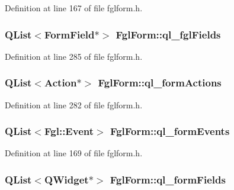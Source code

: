 Definition at line 167 of file fglform.h.

\hypertarget{classFglForm_a1d775e481b65ae50b2a557fa9ae975c5}{
\subsubsection[{ql\_\-fglFields}]{\setlength{\rightskip}{0pt plus 5cm}QList$<${\bf FormField}$\ast$$>$ {\bf FglForm::ql\_\-fglFields}}}
\label{classFglForm_a1d775e481b65ae50b2a557fa9ae975c5}


Definition at line 285 of file fglform.h.

\hypertarget{classFglForm_a091b50c03ba4a353485d34ea34f4001a}{
\subsubsection[{ql\_\-formActions}]{\setlength{\rightskip}{0pt plus 5cm}QList$<${\bf Action}$\ast$$>$ {\bf FglForm::ql\_\-formActions}}}
\label{classFglForm_a091b50c03ba4a353485d34ea34f4001a}


Definition at line 282 of file fglform.h.

\hypertarget{classFglForm_aec60babfa521575768a4aa1147318ba1}{
\subsubsection[{ql\_\-formEvents}]{\setlength{\rightskip}{0pt plus 5cm}QList$<${\bf Fgl::Event}$>$ {\bf FglForm::ql\_\-formEvents}}}
\label{classFglForm_aec60babfa521575768a4aa1147318ba1}


Definition at line 169 of file fglform.h.

\hypertarget{classFglForm_ad0adbaabeb97d6fabd2a23f5ac5c0069}{
\subsubsection[{ql\_\-formFields}]{\setlength{\rightskip}{0pt plus 5cm}QList$<$QWidget$\ast$$>$ {\bf FglForm::ql\_\-formFields}}}
\label{classFglForm_ad0adbaabeb97d6fabd2a23f5ac5c0069}


